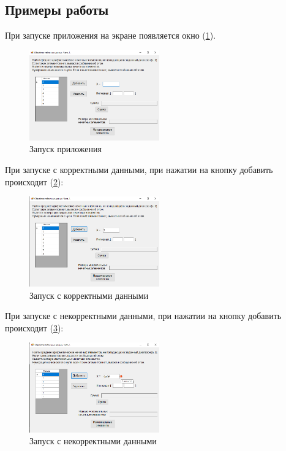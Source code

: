 \subsection{Примеры работы}

При запуске приложения на экране появляется окно (\ref{fig:StartForm4}).

\newpage

\begin{figure}[!h]
    \centering
    \includegraphics[width = 0.5\textwidth]{images/Task4/Start.png}
    \caption{Запуск приложения}
    \label{fig:StartForm4}
\end{figure}

При запуске с корректными данными, при нажатии на кнопку добавить происходит (\ref{fig:WorkForm4}):

\begin{figure}[!h]
    \centering
    \includegraphics[width = 0.5\textwidth]{images/Task4/WorkAdd.png}
    \caption{Запуск с корректными данными}
    \label{fig:WorkForm4}
\end{figure}

При запуске с некорректными данными, при нажатии на кнопку добавить происходит  (\ref{fig:BadInputNotIntForm4}):

\begin{figure}[!h]
    \centering
    \includegraphics[width = 0.5\textwidth]{images/Task4/BadInputNotIntX.png}
    \caption{Запуск с некорректными данными}
    \label{fig:BadInputNotIntForm4}
\end{figure}

